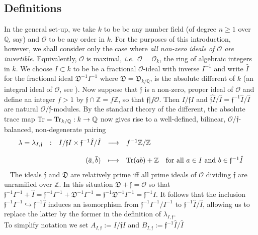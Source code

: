 \documentclass[12pt]{article}
\newcommand{\addwords}[1]{\ \ \ \mbox{#1}}
\newcommand{\bbQ}{\ensuremath{\mathbb{Q}}}
\newcommand{\bbZ}{\ensuremath{\mathbb{Z}}}
\newcommand{\cO}{\ensuremath{\mathcal{O}}}
\newcommand{\displaymapdef}[5]
{
	\begin{array}{rcrcl}
		#1 &:& #2 &\longrightarrow& #3 \\
		& &    &                    \\
		& & #4 &\longmapsto    & #5
	\end{array}
}
\newcommand{\fD}{\ensuremath{\mathfrak{D}}}
\newcommand{\ff}{\ensuremath{\mathfrak{f}}}
\newcommand{\Hom}{{\rm Hom}}
\newcommand{\ie}{{\em i.e.}}
\newcommand{\inv}{^{-1}}%
\renewcommand{\rem}{\refstepcounter{rem}\noindent{\sc Remark \therem}}
\renewcommand{\therem}{\thesection.\arabic{rem}}
\newcommand{\Tr}{{\rm Tr}}
\newcommand{\Of}{{\cO/\ff}}
\begin{document}
\subsection{Definitions} 
In the general set-up, we take $k$ to be be any number field (of degree $n\geq 1$ over $\bbQ$, say) and $\cO$ to be any order in $k$. For the purposes of this introduction, however, we shall consider only the case  where \textit{all non-zero ideals of $\cO$ are invertible.} Equivalently, $\cO$ is maximal, \ie\  $\cO=\cO_k$, the ring of algebraic integers in $k$. We choose $I\subset k$ to be be a fractional $\cO$-ideal with inverse $I\inv$ and write $\hat{I}$ for the fractional ideal $\fD\inv I\inv$ where $\fD=\fD_{k/\bbQ}$, is the absolute different of $k$ (an integral ideal of $\cO$, see \cite[Ch.\ 3]{Serre Local fields}). 
%
Now suppose that $\ff$ is a non-zero, proper ideal of $\cO$ and define an integer $f>1$ by $\ff\cap\bbZ=f\bbZ$, so that $\ff|f\cO$. Then $I/\ff I$ and  $\widehat{\ff I}/\hat I=\ff\inv\hat I/\hat I$ are natural $\cO/\ff$-modules. By the standard theory of the different, the absolute trace map  $\Tr=\Tr_{k/\bbQ}:k\rightarrow \bbQ$ now gives rise to a well-defined, bilinear, $\cO/\ff$-balanced, non-degenerate pairing
$$
\displaymapdef{\lambda=\lambda_{I,\ff}}{I/\ff I\times \ff\inv  \hat I/\hat{I}}
{f\inv\bbZ/\bbZ}
{(\bar{a},\bar{b})}
{\Tr(ab)+\bbZ\addwords{for all $a\in I$ and $b\in\ff\inv\hat I$}}
$$
\rem\label{rem:two simplifications}\ %
The ideals $\ff$ and $\fD$ are relatively prime iff all prime ideals of $\cO$ dividing $\ff$ are unramified over $\bbZ$. In this situation $\fD+\ff=\cO$ so that $\ff\inv I\inv+\hat I=\ff\inv I\inv+\fD\inv I\inv=\ff\inv\fD\inv I\inv=\ff\inv\hat I$. It follows that the inclusion $\ff\inv I\inv\hookrightarrow \ff\inv \hat I$ induces an 
isomorphism from $\ff\inv I\inv/I\inv$ to $\ff\inv  \hat I/\hat{I}$, allowing us to replace the latter by the former in the definition of $\lambda_{I,\ff}$. 
\bigskip\\ 
To simplify notation we set 
$
A_{I,\ff}:= I/\ff I$ and $B_{I,\ff}:= \ff\inv \hat I/\hat I
$
\end{document}
